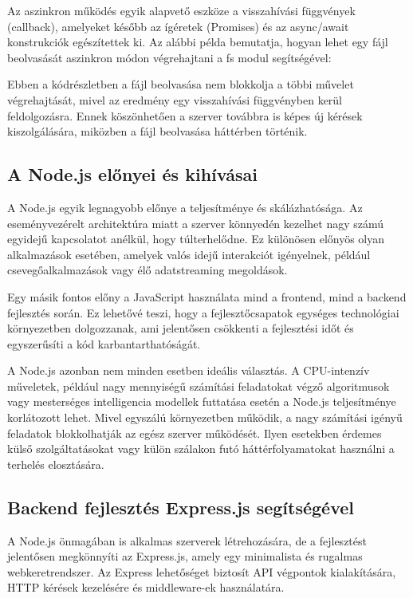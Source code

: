\documentclass[
]{thesis-ekf}
\theoremstyle{definition}
\theoremstyle{remark}
\begin{document}
Az aszinkron működés egyik alapvető eszköze a visszahívási függvények (callback), amelyeket később az ígéretek (Promises) és az async/await konstrukciók egészítettek ki. Az alábbi példa bemutatja, hogyan lehet egy fájl beolvasását aszinkron módon végrehajtani a fs modul segítségével:

%

Ebben a kódrészletben a fájl beolvasása nem blokkolja a többi művelet végrehajtását, mivel az eredmény egy visszahívási függvényben kerül feldolgozásra. Ennek köszönhetően a szerver továbbra is képes új kérések kiszolgálására, miközben a fájl beolvasása háttérben történik.

\subsection{A Node.js előnyei és kihívásai}
A Node.js egyik legnagyobb előnye a teljesítménye és skálázhatósága. Az eseményvezérelt architektúra miatt a szerver könnyedén kezelhet nagy számú egyidejű kapcsolatot anélkül, hogy túlterhelődne. Ez különösen előnyös olyan alkalmazások esetében, amelyek valós idejű interakciót igényelnek, például csevegőalkalmazások vagy élő adatstreaming megoldások.

Egy másik fontos előny a JavaScript használata mind a frontend, mind a backend fejlesztés során. Ez lehetővé teszi, hogy a fejlesztőcsapatok egységes technológiai környezetben dolgozzanak, ami jelentősen csökkenti a fejlesztési időt és egyszerűsíti a kód karbantarthatóságát.

A Node.js azonban nem minden esetben ideális választás. A CPU-intenzív műveletek, például nagy mennyiségű számítási feladatokat végző algoritmusok vagy mesterséges intelligencia modellek futtatása esetén a Node.js teljesítménye korlátozott lehet. Mivel egyszálú környezetben működik, a nagy számítási igényű feladatok blokkolhatják az egész szerver működését. Ilyen esetekben érdemes külső szolgáltatásokat vagy külön szálakon futó háttérfolyamatokat használni a terhelés elosztására.

\subsection{Backend fejlesztés Express.js segítségével}

A Node.js önmagában is alkalmas szerverek létrehozására, de a fejlesztést jelentősen megkönnyíti az Express.js, amely egy minimalista és rugalmas webkeretrendszer. Az Express lehetőséget biztosít API végpontok kialakítására, HTTP kérések kezelésére és middleware-ek használatára.
\end{document}
